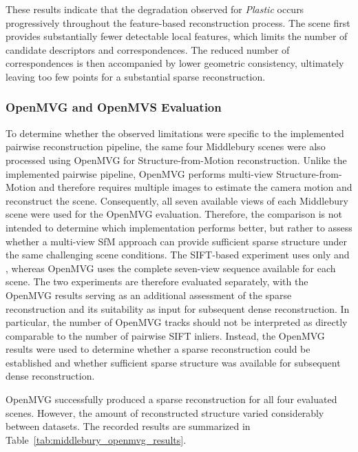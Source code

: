 These results indicate that the degradation observed for \textit{Plastic}
occurs progressively throughout the feature-based reconstruction process. The
scene first provides substantially fewer detectable local features, which
limits the number of candidate descriptors and correspondences. The reduced
number of correspondences is then accompanied by lower geometric consistency,
ultimately leaving too few points for a substantial sparse reconstruction.

\subsubsection{OpenMVG and OpenMVS Evaluation}

To determine whether the observed limitations were specific to the implemented
pairwise reconstruction pipeline, the same four Middlebury scenes were also
processed using OpenMVG for Structure-from-Motion reconstruction. Unlike the
implemented pairwise pipeline, OpenMVG performs multi-view Structure-from-Motion
and therefore requires multiple images to estimate the camera motion and
reconstruct the scene. Consequently, all seven available views of each Middlebury
scene were used for the OpenMVG evaluation.
Therefore, the comparison is not intended to determine which implementation performs better, but rather to assess whether a multi-view SfM approach can provide sufficient sparse structure under the same challenging scene conditions. The SIFT-based experiment uses
only  and , whereas OpenMVG uses the complete
seven-view sequence available for each scene. The two experiments are
therefore evaluated separately, with the OpenMVG results serving as an
additional assessment of the sparse reconstruction and its suitability as
input for subsequent dense reconstruction.
In particular, the number of OpenMVG tracks should not be interpreted as
directly comparable to the number of pairwise SIFT inliers. Instead, the
OpenMVG results were used to determine whether a sparse reconstruction could
be established and whether sufficient sparse structure was available for
subsequent dense reconstruction.

OpenMVG successfully produced a sparse reconstruction for all four evaluated
scenes. However, the amount of reconstructed structure varied considerably
between datasets. The recorded results are summarized in
Table~\ref{tab:middlebury_openmvg_results}.


\begin{table}[H]
\centering
\caption{OpenMVG sparse reconstruction results on the Middlebury scenes.}
\label{tab:middlebury_openmvg_results}
\end{table}

